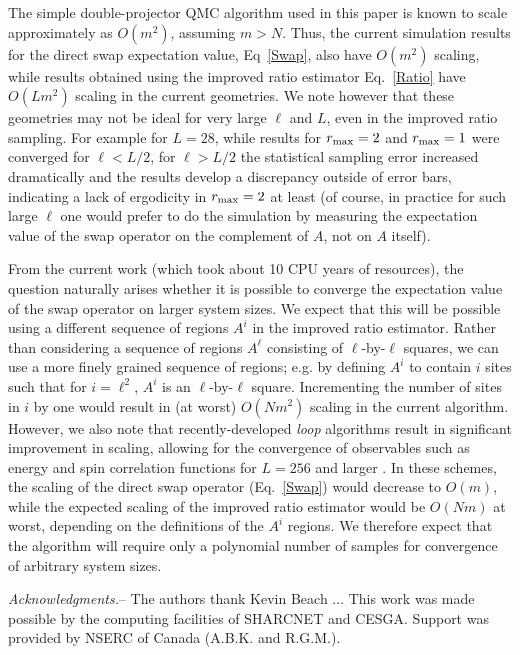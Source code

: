 \documentclass[prl,aps,twocolumn,floatfix,amsmath,amssymb,superscriptaddress,tightenlines]{revtex4}
\begin{document}
The simple double-projector QMC algorithm used in this paper is known to scale approximately as $O(m^2)$, \cite{AWSloop}
assuming $m >N$.
Thus, the current simulation results for the direct swap expectation value, Eq~\eqref{Swap}, also have
 $O(m^2)$ scaling, while results obtained using the improved ratio estimator Eq.~\eqref{Ratio} have $O(Lm^2)$ scaling in the current geometries.
We note however that these geometries may not be ideal for very large $\ell$ and $L$, even in the improved ratio sampling.
For example for $L=28$, %
while results for $r_{\rm max}=2$ and $r_{\rm max}=1$ were converged for $\ell < L/2$, for $\ell>L/2$ the
statistical sampling error increased dramatically and the results develop a discrepancy outside of error bars, indicating a lack of ergodicity
in $r_{\rm max}=2$ at least (of course, in practice for such large $\ell$ one would prefer to do the simulation by measuring the 
expectation value of the swap operator on the complement of $A$, not on $A$ itself).

From the current work (which took about 10 CPU years of resources), 
the question naturally arises whether it is possible to converge the expectation value of the swap operator on
larger system sizes.  %
We expect that this will be possible using a different
sequence of regions $A^i$ in the improved ratio estimator.
Rather than considering a sequence of regions $A^{\ell}$ consisting of $\ell$-by-$\ell$ squares, 
we can use a more finely grained sequence of regions; e.g. by defining $A^i$ to contain
$i$ sites such that for $i=\ell^2$, $A^i$ is an $\ell$-by-$\ell$ square.  Incrementing the number of sites in $i$ by one would result in
(at worst) $O(Nm^2)$ scaling in the current algorithm.  
However, we also note that recently-developed {\it loop} algorithms
result in significant improvement in scaling, allowing for the convergence of observables such as energy and spin correlation functions for $L=256$ and larger \cite{AWSloop}.  In these schemes, the scaling of the direct swap operator (Eq.~\eqref{Swap}) 
would decrease to $O(m)$, while the expected scaling of the improved ratio estimator would be $O(Nm)$ at worst, depending
on the definitions of the $A^i$ regions.
We therefore expect that
the algorithm will require only a polynomial number of samples for convergence of arbitrary system sizes.


{\it Acknowledgments.}-- The authors thank Kevin Beach ...
This work was made possible by the
computing facilities of SHARCNET and CESGA.  Support was provided by NSERC
of Canada (A.B.K. and R.G.M.).


\end{document}
